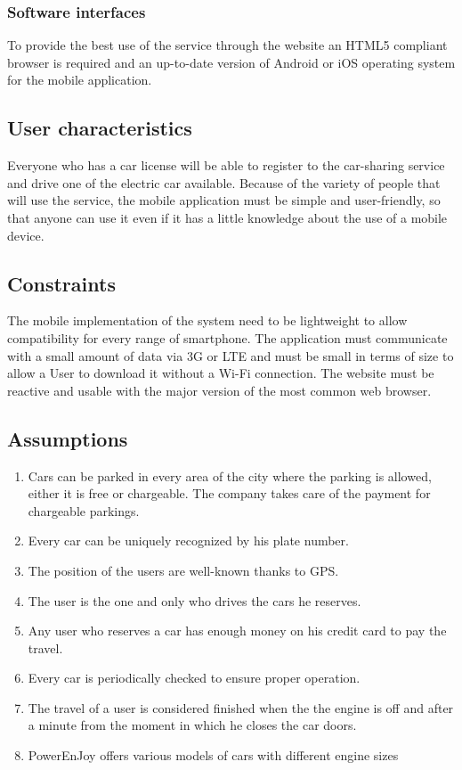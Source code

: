 \subsubsection{Software interfaces}
To provide the best use of the service through the website an HTML5 compliant browser is required and an up-to-date version of Android or iOS operating system for the mobile application.





\subsection{User characteristics}
Everyone who has a car license will be able to register to the car-sharing service and drive one of the electric car available.
Because of the variety of people that will use the service, the mobile application must be simple and user-friendly, so that anyone can use it even if it has a little knowledge about the use of a mobile device.

\subsection{Constraints}
The mobile implementation of the system need to be lightweight to allow compatibility for every range of smartphone. The application must communicate with a small amount of data via 3G or LTE and must be small in terms of size to allow a User to download it without a Wi-Fi connection.
The website must be reactive and usable with the major version of the most common web browser.

\subsection{Assumptions}

\begin{enumerate}
	\item Cars can be parked in every area of the city where the parking is allowed, either it is free or chargeable. The company 		                    takes care of the payment for chargeable parkings. 
	\item Every car can be uniquely recognized by his plate number.
	\item The position of the users are well-known thanks to GPS.
	\item The user is the one and only who drives the cars he reserves.
	\item Any user who reserves a car has enough money on his credit card to pay the travel.
	\item Every car is periodically checked to ensure proper operation.
	\item The travel of a user is considered finished when the the engine is off and after a minute from the moment in which he closes the car doors.
	\item PowerEnJoy offers various models of cars with different engine sizes
\end{enumerate}

